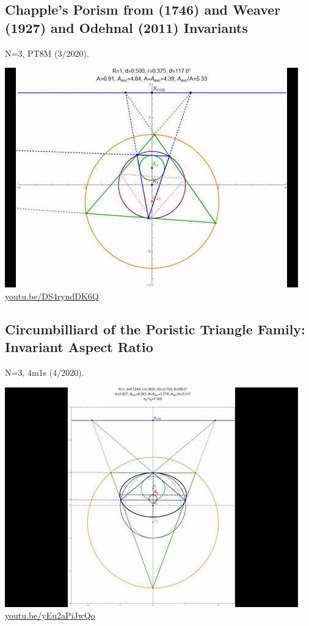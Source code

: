 \documentclass[12pt]{amsart}
\begin{document}
\subsection{Chapple's Porism from (1746) and Weaver (1927) and Odehnal (2011) Invariants}
\label{vid:DS4ryndDK6Q}
\noindent N=3, PT8M (3/2020). 
\begin{center}\includegraphics[width=.5\textwidth]{pics/DS4ryndDK6Q.jpg} \\ 
\href{https://youtu.be/DS4ryndDK6Q}{\url{youtu.be/DS4ryndDK6Q}}\end{center}
% 

\subsection{Circumbilliard of the Poristic Triangle Family: Invariant Aspect Ratio}
\label{vid:yEu2aPiJwQo}
\noindent N=3, 4m1s (4/2020). 
\begin{center}\includegraphics[width=.5\textwidth]{pics/yEu2aPiJwQo.jpg} \\ 
\href{https://youtu.be/yEu2aPiJwQo}{\url{youtu.be/yEu2aPiJwQo}}\end{center}
% 
\end{document}
